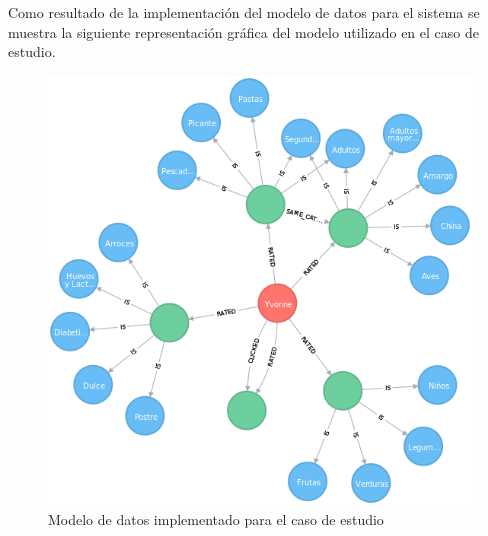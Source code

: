     Como resultado de la implementación del modelo de datos para el sistema se muestra la siguiente representación gráfica del modelo utilizado en el caso de estudio. 
            \begin{figure}[h!]
            \centering
            \includegraphics[width=12cm]{./images/graph}
            \caption{Modelo de datos implementado para el caso de estudio}
          \end{figure}

